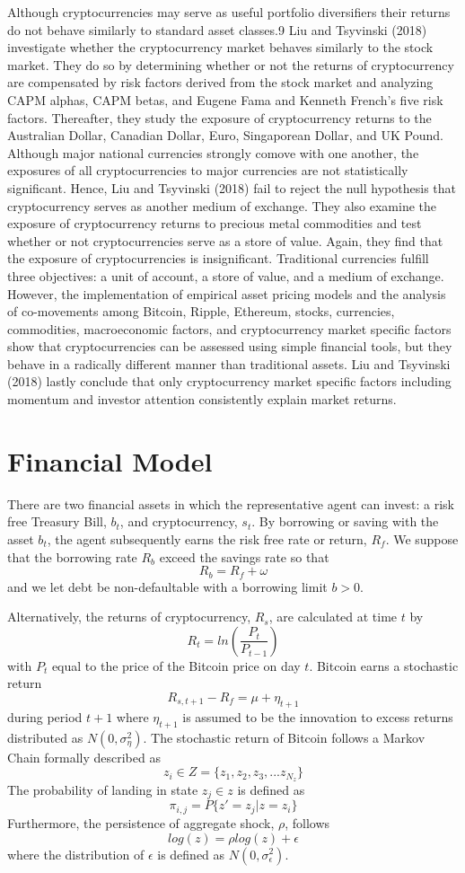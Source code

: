 \documentclass[]{article}
\begin{document}
Although cryptocurrencies may serve as useful portfolio diversifiers
their returns do not behave similarly to standard asset classes.9 Liu
and Tsyvinski (2018) investigate whether the cryptocurrency market
behaves similarly to the stock market. They do so by determining whether
or not the returns of cryptocurrency are compensated by risk factors
derived from the stock market and analyzing CAPM alphas, CAPM betas, and
Eugene Fama and Kenneth French's five risk factors. Thereafter, they
study the exposure of cryptocurrency returns to the Australian Dollar,
Canadian Dollar, Euro, Singaporean Dollar, and UK Pound. Although major
national currencies strongly comove with one another, the exposures of
all cryptocurrencies to major currencies are not statistically
significant. Hence, Liu and Tsyvinski (2018) fail to reject the null
hypothesis that cryptocurrency serves as another medium of exchange.
They also examine the exposure of cryptocurrency returns to precious
metal commodities and test whether or not cryptocurrencies serve as a
store of value. Again, they find that the exposure of cryptocurrencies
is insignificant. Traditional currencies fulfill three objectives: a
unit of account, a store of value, and a medium of exchange. However,
the implementation of empirical asset pricing models and the analysis of
co-movements among Bitcoin, Ripple, Ethereum, stocks, currencies,
commodities, macroeconomic factors, and cryptocurrency market specific
factors show that cryptocurrencies can be assessed using simple
financial tools, but they behave in a radically different manner than
traditional assets. Liu and Tsyvinski (2018) lastly conclude that only
cryptocurrency market specific factors including momentum and investor
attention consistently explain market returns.

\section{Financial Model}\label{financial-model}

There are two financial assets in which the representative agent can
invest: a risk free Treasury Bill, \(b_t\), and cryptocurrency, \(s_t\).
By borrowing or saving with the asset \(b_t\), the agent subsequently
earns the risk free rate or return, \(R_f\). We suppose that the
borrowing rate \(R_b\) exceed the savings rate so that
\[R_b = R_f + \omega\] and we let debt be non-defaultable with a
borrowing limit \(b > 0\).

Alternatively, the returns of cryptocurrency, \(R_s\), are calculated at
time \(t\) by \[R_{t} = ln(\frac{P_t}{P_{t-1}})\] with \(P_t\) equal to
the price of the Bitcoin price on day \(t\). Bitcoin earns a stochastic
return \[R_{s, t+1} - R_f = \mu + \eta_{t+1}\] during period \(t + 1\)
where \(\eta_{t+1}\) is assumed to be the innovation to excess returns
distributed as \(N(0, \sigma_\eta^2)\). The stochastic return of Bitcoin
follows a Markov Chain formally described as
\[z_i \in  Z = \{z_1, z_2, z_3, ... z_{N_z}\}\] The probability of
landing in state \(z_j \in z\) is defined as
\[\pi_{i,j} = P\{z' = z_j | z = z_i\}\] Furthermore, the persistence of
aggregate shock, \(\rho\), follows \[log(z) = \rho log(z) + \epsilon\]
where the distribution of \(\epsilon\) is defined as
\(N(0, \sigma_\epsilon^2)\).
\end{document}
